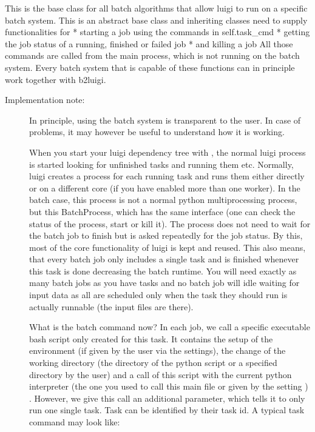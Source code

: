 \documentclass[letterpaper,10pt,english]{sphinxmanual}
\begin{document}
\begin{fulllineitems}
\label{\detokenize{usage/batch:b2luigi.batch.processes.BatchProcess}}
This is the base class for all batch algorithms that allow luigi to run on a specific batch system.
This is an abstract base class and inheriting classes need to supply functionalities for
* starting a job using the commands in self.task\_cmd
* getting the job status of a running, finished or failed job
* and killing a job
All those commands are called from the main process, which is not running on the batch system.
Every batch system that is capable of these functions can in principle work together with b2luigi.
\begin{description}
\item[{Implementation note:}] \leavevmode
In principle, using the batch system is transparent to the user. In case of problems, it
may however be useful to understand how it is working.

When you start your luigi dependency tree with , the normal
luigi process is started looking for unfinished tasks and running them etc.
Normally, luigi creates a process for each running task and runs them either directly
or on a different core (if you have enabled more than one worker).
In the batch case, this process is not a normal python multiprocessing process,
but this BatchProcess, which has the same interface (one can check the status of the process,
start or kill it). The process does not need to wait for the batch job to finish but
is asked repeatedly for the job status. By this, most of the core functionality of luigi
is kept and reused.
This also means, that every batch job only includes a single task and is finished whenever
this task is done decreasing the batch runtime. You will need exactly as many batch jobs
as you have tasks and no batch job will idle waiting for input data as all are scheduled
only when the task they should run is actually runnable (the input files are there).

What is the batch command now? In each job, we call a specific executable bash script
only created for this task. It contains the setup of the environment (if given by the
user via the settings), the change of the working directory (the directory of the
python script or a specified directory by the user) and a call of this script with the
current python interpreter (the one you used to call this main file or given by the
setting ) . However, we give this call an additional parameter, which tells it
to only run one single task. Task can be identified by their task id. A typical task command may look like:


\end{description}
\end{fulllineitems}
\end{document}
